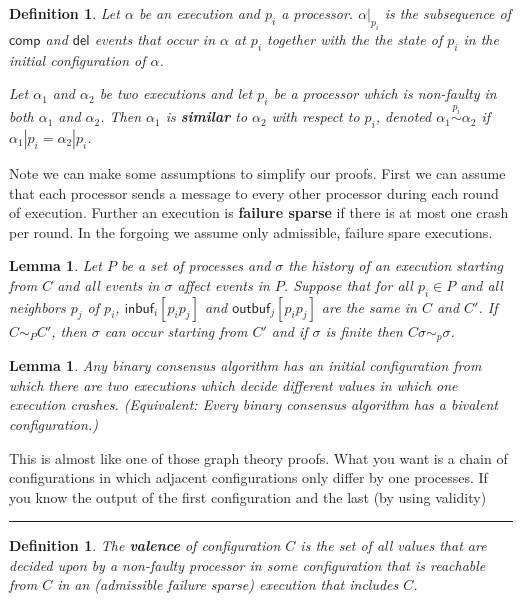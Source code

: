 \documentclass[twoside]{article}
\newtheorem{lemma}[theorem]{Lemma}
\newtheorem{definition}[theorem]{Definition}
\newenvironment{proof}{{\bf Proof:}}{\hfill\rule{2mm}{2mm}}
\newcommand\comp{\mathsf{comp}}
\newcommand\del{\mathsf{del}}
\newcommand\inbuf{\mathsf{inbuf}}
\newcommand\outbuf{\mathsf{outbuf}}
\begin{document}
\begin{definition}
Let $\alpha$ be an execution and $p_i$ a processor. $\alpha |_{p_i}$ is the subsequence of $\comp$ and $\del$ events that occur in $\alpha$ at $p_i$ together with the the state of $p_i$ in the initial configuration of $\alpha$.

Let $\alpha_1$ and $\alpha_2$ be two executions and let $p_i$ be a processor which is non-faulty in both $\alpha_1$ and $\alpha_2$. Then $\alpha_1$ is \textbf{similar} to $\alpha_2$ with respect to $p_i$, denoted $\alpha_1 \stackrel{p_i}{\sim} \alpha_2$ if $\alpha_1 | p_i = \alpha_2 | p_i$.
\end{definition}

Note we can make some assumptions to simplify our proofs. First we can assume that each processor sends a message to every other processor during each round of execution. Further an execution is \textbf{failure sparse} if there is at most one crash per round. In the forgoing we assume only admissible, failure spare executions.

\begin{lemma}
Let $P$ be a set of processes and $\sigma$ the history of an execution starting from $C$ and all events in $\sigma$ affect events in $P$. Suppose that for all $p_i \in P$ and all neighbors $p_j$ of $p_i$, $\inbuf_{i}[p_ip_j]$ and $\outbuf_j[p_ip_j]$ are the same in $C$ and $C'$. If $C\sim_P C'$, then $\sigma$ can occur starting from $C'$ and if $\sigma$ is finite then $C\sigma \sim_p \sigma$.
\end{lemma}

\begin{lemma}
Any binary consensus algorithm has an initial configuration from which there are two executions which decide different values in which one execution crashes. (Equivalent: Every binary consensus algorithm has a bivalent configuration.) 
\end{lemma}
\begin{proof}
This is almost like one of those graph theory proofs. What you want is a chain of configurations in which adjacent configurations only differ by one processes. If you know the output of the first configuration and the last (by using validity)
\end{proof}

\begin{definition}
The \textbf{valence} of configuration $C$ is the set of all values that are decided upon by a non-faulty processor in some configuration that is reachable from $C$ in an (admissible failure sparse) execution that includes $C$.
\end{definition}
\end{document}
